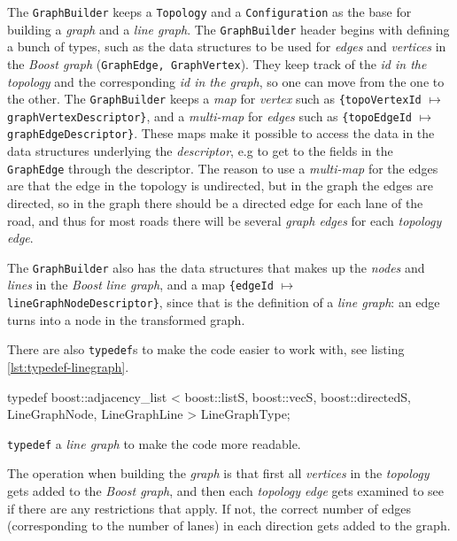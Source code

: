 \documentclass[../main.tex]{subfiles}
\begin{document}
\noindent
The \texttt{GraphBuilder} keeps a \texttt{Topology} and a \texttt{Configuration} as the base for building a \textit{graph} and a \textit{line graph}.
The \texttt{GraphBuilder} header begins with defining a bunch of types, such as the data structures to be used for \textit{edges} and \textit{vertices} in the \textit{Boost graph} (\texttt{GraphEdge, GraphVertex}). They keep track of the \textit{id in the topology} and the corresponding \textit{id in the graph}, so one can move from the one to the other. The \texttt{GraphBuilder} keeps a \textit{map} for \textit{vertex} such as \texttt{\{topoVertexId} $\mapsto$ \texttt{graphVertexDescriptor\}}, and a \textit{multi-map} for \textit{edges} such as \texttt{\{topoEdgeId} $\mapsto$ \texttt{graphEdgeDescriptor\}}. These maps make it possible to access the data in the data structures underlying the \textit{descriptor}, e.g to get to the fields in the \texttt{GraphEdge} through the descriptor. The reason to use a \textit{multi-map} for the edges are that the edge in the topology is undirected, but in the graph the edges are directed, so in the graph there should be a directed edge for each lane of the road, and thus for most roads there will be several \textit{graph edges} for each \textit{topology edge}.

The \texttt{GraphBuilder} also has the data structures that makes up the \textit{nodes} and \textit{lines} in the \textit{Boost line graph}, and a map \texttt{\{edgeId} $\mapsto$ \texttt{lineGraphNodeDescriptor\}}, since that is the definition of a \textit{line graph}: an edge turns into a node in the transformed graph.

There are also \texttt{typedef}s to make the code easier to work with, see listing \ref{lst:typedef-linegraph}.

\begin{mylisting}
\begin{cppcode}
typedef boost::adjacency_list
   < boost::listS, boost::vecS, boost::directedS,
    LineGraphNode, LineGraphLine >                             LineGraphType;
\end{cppcode}
\caption{\texttt{typedef} a \textit{line graph} to make the code more readable.}
\label{lst:typedef-linegraph}
\end{mylisting}

The operation when building the \textit{graph} is that first all \textit{vertices} in the \textit{topology} gets added to the \textit{Boost graph}, and then each \textit{topology edge} gets examined to see if there are any restrictions that apply. If not, the correct number of edges (corresponding to the number of lanes) in each direction gets added to the graph.
\end{document}
